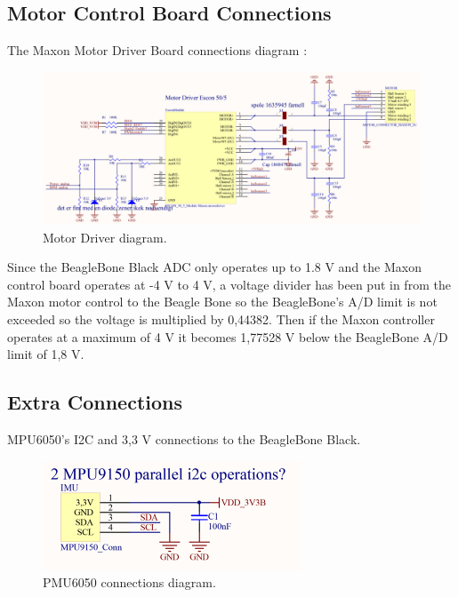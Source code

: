 \subsection{Motor Control Board Connections}
The Maxon Motor Driver Board connections diagram :\\

\begin{figure}[H]
	\centering
	\includegraphics[scale=0.92]{figures/MotorDriver.pdf}
	\caption{Motor Driver diagram.}
	\label{labMotorDriver}
\end{figure}\vspace{-5mm}

Since the BeagleBone Black ADC only operates up to 1.8 V and the Maxon control board operates at -4 V to 4 V, a voltage divider has been put in from the Maxon motor control to the Beagle Bone so the BeagleBone’s A/D limit is not exceeded so the voltage is multiplied by 0,44382. Then if the Maxon controller operates at a maximum of 4 V it becomes 1,77528 V below the BeagleBone A/D limit of 1,8 V.

\subsection{Extra Connections}
MPU6050's I2C and 3,3 V connections to the BeagleBone Black.
\begin{figure}[H]
	\centering
	\includegraphics[scale=0.92]{figures/PMU9150.pdf}
	\caption{PMU6050 connections diagram.}
	\label{labPMU9150}
\end{figure}\vspace{-5mm}

